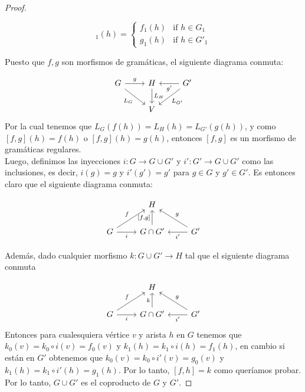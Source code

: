 \documentclass[../main.tex]{subfiles}
\begin{document}
\begin{proof}
\begin{multicols}{2}
		\begin{equation*}
			[f,g]_1(h)=
			\begin{cases}
				f_1(h) & \text{if } h \in G_1\\
				g_1(h) & \text{if } h \in G'_1
			\end{cases}
		\end{equation*}
	\end{multicols}
	Puesto que $f,g$ son morfismos de gramáticas, el siguiente diagrama conmuta:
	
 	\[
	\begin{tikzcd}
		G \arrow{r}{g} \arrow[swap]{rd}{L_G} & H \arrow{d}{L_H}  & G' \arrow{ld}{L_{G'}} \arrow{l}{g'} \\
		& V 
	\end{tikzcd}
	\]
	Por la cual tenemos que $L_G(f(h))=L_H(h)=L_{G'}(g(h))$, y como $[f,g](h)=f(h)$ o $[f,g](h)=g(h)$, entonces $[f,g]$ es un morfismo de gramáticas regulares. \\
	Luego, definimos las inyecciones $i:G \to G \cup G'$ y $i':G' \to G \cup G'$ como las inclusiones, es decir, $i(g)=g$ y $i'(g')=g'$ para $g \in G$ y $g' \in G'$. Es entonces claro que el siguiente diagrama conmuta: 
	
 	 \[
	\begin{tikzcd} 		
		& H  & \\
		G \arrow[swap]{r}{i} \arrow{ru}{f} & G\cap G' \arrow{u}{[f,g]} & G' \arrow{l}{i'} \arrow[swap]{lu}{g}
	\end{tikzcd}
	\]
	
	Además, dado cualquier morfismo $k: G \cup G' \to H$ tal que el siguiente diagrama conmuta
	
	 	 \[
	\begin{tikzcd} 		
		& H  & \\
		G \arrow[swap]{r}{i} \arrow{ru}{f} & G\cap G' \arrow{u}{k} & G' \arrow{l}{i'} \arrow[swap]{lu}{g}
	\end{tikzcd}
	\]
	Entonces para cualesquiera vértice $v$ y arista $h$ en $G$ tenemos que 
	$k_0(v)=k_0\circ i(v) = f_0(v)$ y $k_1(h)=k_1\circ i(h) = f_1(h)$, en cambio si están en $G'$ obtenemos que $k_0(v)=k_0\circ i'(v) = g_0(v)$ y $k_1(h)=k_1\circ i'(h) = g_1(h)$. Por lo tanto, $[f,h]=k$ como queríamos probar. \\
	Por lo tanto, $G \cup G'$ es el coproducto de $G$ y $G'$. 
 \end{proof}

	
 
\end{document}
